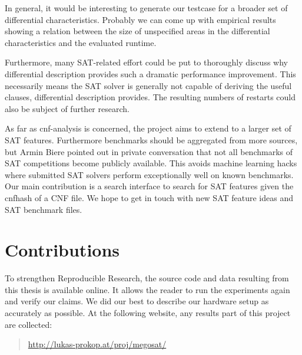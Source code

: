 In general, it would be interesting to generate our testcase for a broader
set of differential characteristics. Probably we can come up with empirical
results showing a relation between the size of unspecified areas in the
differential characteristics and the evaluated runtime.

Furthermore, many SAT-related effort could be put to thoroughly discuss
why differential description provides such a dramatic performance improvement.
This necessarily means the SAT solver is generally not capable of deriving
the useful clauses, differential description provides. The resulting
numbers of restarts could also be subject of further research.

As far as cnf-analysis is concerned, the project aims to extend to
a larger set of SAT features. Furthermore benchmarks should be aggregated
from more sources, but Armin Biere pointed out in private conversation
that not all benchmarks of SAT competitions become publicly available.
This avoids machine learning hacks where submitted SAT solvers perform
exceptionally well on known benchmarks. Our main contribution is a search
interface to search for SAT features given the cnfhash of a CNF file.
We hope to get in touch with new SAT feature ideas and SAT benchmark files.

\section{Contributions}
\label{sec:contributions}
%
To strengthen Reproducible Research, the source code and data resulting from this thesis is available online.
It allows the reader to run the experiments again and verify our claims.
We did our best to describe our hardware setup as accurately as possible.
At the following website, any results part of this project are collected:

\begin{quote}
  \url{http://lukas-prokop.at/proj/megosat/}
\end{quote}

